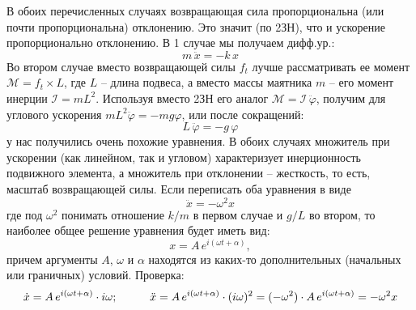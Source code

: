 \documentclass[12pt,epsfig,color,russian]{article}
\begin{document}
В обоих перечисленных случаях возвращающая сила пропорциональна (или почти пропорциональна) отклонению. Это значит (по 2ЗН), что и ускорение пропорционально отклонению. В 1 случае мы получаем дифф.ур.:\vspace{-3mm}
\begin{equation}
m\,\ddot{x}=-k\,x
\end{equation}
Во втором случае вместо возвращающей силы $f_t$ лучше рассматривать ее момент $\mathcal{M}=f_t\times L$, где $L$ -- длина подвеса, а вместо массы маятника $m$ -- его момент инерции $\mathcal{I}=mL^2$. Используя вместо 2ЗН его аналог $\mathcal{M=I}\,\ddot{\varphi}$, получим для углового ускорения $mL^2\ddot{\varphi}=-mg\varphi$, или после сокращений:\vspace{-5mm}
\begin{equation}
L\,\ddot{\varphi}=-g\,\varphi
\end{equation}
у нас получились очень похожие уравнения. В обоих случаях множитель при ускорении (как линейном, так и угловом) характеризует инерционность подвижного элемента, а множитель при отклонении -- жесткость, то есть, масштаб возвращающей силы. Если переписать оба уравнения в виде
\begin{displaymath}
\ddot{x}=-\omega^2x
\end{displaymath}
где под $\omega^2$ понимать отношение $k/m$ в первом случае и $g/L$ во втором, то наиболее общее решение уравнения будет иметь вид:
\begin{equation}
x=A\,e^{i(\omega t+\alpha)},
\end{equation}
 причем аргументы $A$, $\omega$ и $\alpha$ находятся из каких-то дополнительных (на\-чаль\-ных или граничных) условий. Проверка:
\begin{displaymath}
\dot{x}=A\,e^{i(\omega t+\alpha)}\cdot i\omega;\hspace{10mm}\ddot{x}=
A\,e^{i(\omega t+\alpha)}\cdot (i\omega)^2=(-\omega^2)\cdot A\,e^{i(\omega t+\alpha)}
=-\omega^2x
\end{displaymath}
\end{document}
